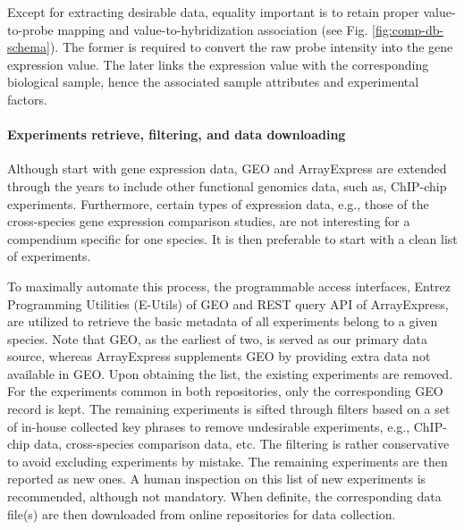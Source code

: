 %
Except for extracting desirable data, equality important is to retain proper
value-to-probe mapping and value-to-hybridization association (see
Fig. \ref{fig:comp-db-schema}).
%
The former is required to convert the raw probe intensity into the gene
expression value.
%
The later links the expression value with the corresponding biological sample,
hence the associated sample attributes and experimental factors.




\paragraph{Experiments retrieve, filtering, and data downloading}

Although start with gene expression data, GEO and ArrayExpress are extended
through the years to include other functional genomics data, such as,
ChIP-chip experiments.
%
Furthermore, certain types of expression data, e.g., those of the
cross-species gene expression comparison studies, are not interesting
for a compendium specific for one species.
%
It is then preferable to start with a clean list of experiments.




To maximally automate this process, the programmable access interfaces,
Entrez Programming Utilities (E-Utils) of GEO and REST query API of
ArrayExpress, are utilized to retrieve the basic metadata of all
experiments belong to a given species.
%
Note that GEO, as the earliest of two, is served as our primary data source,
whereas ArrayExpress supplements GEO by providing extra data not available in
GEO.
%
Upon obtaining the list, the existing experiments are removed.  For the
experiments common in both repositories, only the corresponding GEO record
is kept.
%
The remaining experiments is sifted through filters based on a set of
in-house collected key phrases to remove undesirable experiments, e.g.,
ChIP-chip data, cross-species comparison data, etc.
%
The filtering is rather conservative to avoid excluding experiments by
mistake.
%
The remaining experiments are then reported as new ones.  A human inspection
on this list of new experiments is recommended, although not mandatory.
%
When definite, the corresponding data file(s) are then downloaded from online
repositories for data collection.









